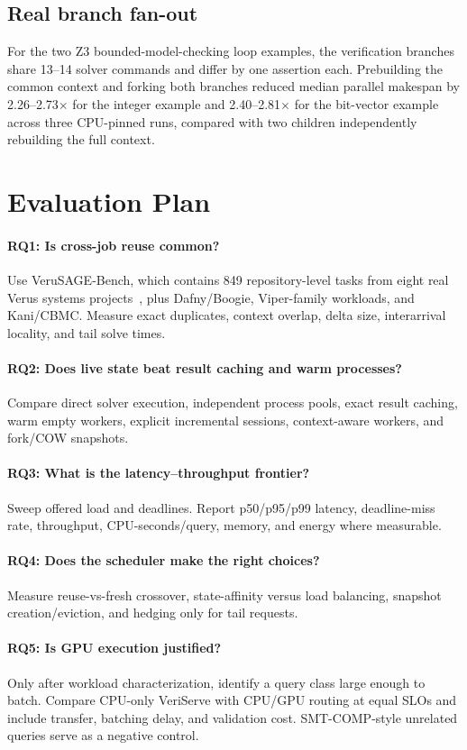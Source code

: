\documentclass[10pt,twocolumn]{article}
\begin{document}
\subsection{Real branch fan-out}
For the two Z3 bounded-model-checking loop examples, the verification branches share 13--14 solver commands and differ by one assertion each. Prebuilding the common context and forking both branches reduced median
parallel makespan by 2.26--2.73$\times$ for the integer example and
2.40--2.81$\times$ for the bit-vector example across three CPU-pinned runs,
compared with two children independently rebuilding the full context.

\section{Evaluation Plan}
\paragraph{RQ1: Is cross-job reuse common?} Use VeruSAGE-Bench, which contains 849 repository-level tasks from eight real Verus systems projects~\cite{verusagebench}, plus Dafny/Boogie, Viper-family workloads, and Kani/CBMC. Measure exact duplicates, context overlap, delta size, interarrival locality, and tail solve times.
\paragraph{RQ2: Does live state beat result caching and warm processes?} Compare direct solver execution, independent process pools, exact result caching, warm empty workers, explicit incremental sessions, context-aware workers, and fork/COW snapshots.
\paragraph{RQ3: What is the latency--throughput frontier?} Sweep offered load and deadlines. Report p50/p95/p99 latency, deadline-miss rate, throughput, CPU-seconds/query, memory, and energy where measurable.
\paragraph{RQ4: Does the scheduler make the right choices?} Measure reuse-vs-fresh crossover, state-affinity versus load balancing, snapshot creation/eviction, and hedging only for tail requests.
\paragraph{RQ5: Is GPU execution justified?} Only after workload characterization, identify a query class large enough to batch. Compare CPU-only VeriServe with CPU/GPU routing at equal SLOs and include transfer, batching delay, and validation cost.
SMT-COMP-style unrelated queries serve as a negative control.
\end{document}
